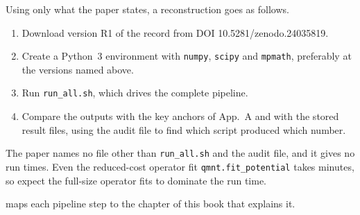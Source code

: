 Using only what the paper states, a reconstruction goes as follows.
\begin{enumerate}
\item Download version R1 of the record from DOI 10.5281/zenodo.24035819.
\item Create a Python~3 environment with \texttt{numpy}, \texttt{scipy} and \texttt{mpmath}, preferably at the versions named above.
\item Run \texttt{run\_all.sh}, which drives the complete pipeline.
\item Compare the outputs with the key anchors of App.~A and with the stored result files, using the audit file to find which script produced which number.
\end{enumerate}
The paper names no file other than \texttt{run\_all.sh} and the audit file, and it gives no run times. Even the reduced-cost operator fit \texttt{qmnt.fit\_potential} takes minutes, so expect the full-size operator fits to dominate the run time.

 maps each pipeline step to the chapter of this book that explains it.

